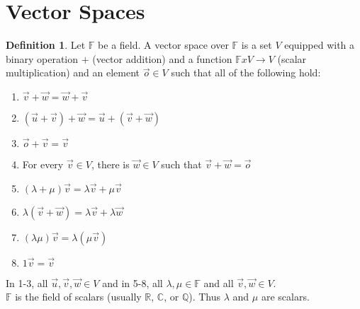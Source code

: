 \documentclass{report}
\theoremstyle{plain}
\theoremstyle{definition}
\newtheorem*{defn}{Definition}
\theoremstyle{plain}
\begin{document}
\section{Vector Spaces}
\begin{defn}
	Let $\mathbb{F}$ be a field. A vector space over $\mathbb{F}$ is a set $V$ equipped with a binary operation $+$ (vector addition) and a function $\mathbb{F} x V \rightarrow V$ (scalar multiplication) and an element $\vec{o} \in V$ such that all of the following hold:
	\begin{enumerate}
	\item $\vec{v} + \vec{w} = \vec{w} + \vec{v}$
	\item $(\vec{u} + \vec{v}) + \vec{w} = \vec{u} + (\vec{v} + \vec{w})$
	\item $\vec{o} + \vec{v} = \vec{v}$
	\item For every $\vec{v} \in V$, there is $\vec{w} \in V$ such that $\vec{v} + \vec{w} = \vec{o}$
	\item $(\lambda + \mu)\vec{v} = \lambda \vec{v} + \mu \vec{v}$
	\item $\lambda (\vec{v} + \vec{w}) = \lambda \vec{v} + \lambda \vec{w}$
	\item $(\lambda \mu) \vec{v} = \lambda(\mu \vec{v})$
	\item $1\vec{v} = \vec{v}$
	\end{enumerate}
	In 1-3, all $\vec{u}, \vec{v}, \vec{w} \in V$ and in 5-8, all $\lambda, \mu \in \mathbb{F}$ and all $\vec{v}, \vec{w} \in V$.\\
	$\mathbb{F}$ is the field of scalars (usually $\mathbb{R}$, $\mathbb{C}$, or $\mathbb{Q}$). Thus $\lambda$ and $\mu$ are scalars.
\end{defn}
\end{document}
